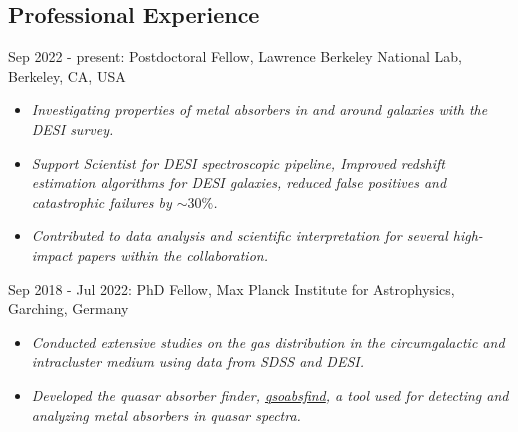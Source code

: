 \documentclass[12pt,letterpaper]{article}
\begin{document}
\subsection{Professional Experience}
\begin{list}{}{\cvlist}
\item Sep 2022 - present: Postdoctoral Fellow, Lawrence Berkeley National Lab, Berkeley, CA, USA \\
\begin{itemize}
 \item \emph{Investigating properties of metal absorbers in and around galaxies with the DESI survey.}
 \item \emph{Support Scientist for DESI spectroscopic pipeline, Improved redshift estimation algorithms for DESI galaxies, reduced false positives and catastrophic failures by $\sim 30\%$.}
  \item \emph{Contributed to data analysis and scientific interpretation for several high-impact papers within the collaboration.}
  \vspace{-1mm}
\end{itemize}
\item Sep 2018 - Jul 2022: PhD Fellow, Max Planck Institute for Astrophysics, Garching, Germany
\begin{itemize}
\item \emph{Conducted extensive studies on the gas distribution in the circumgalactic and intracluster medium using data from SDSS and DESI.}
  \vspace{-1mm}
\item \emph{Developed the quasar absorber finder, \href{https://github.com/abhi0395/qsoabsfind}{qsoabsfind}, a tool used for detecting and analyzing metal absorbers in quasar spectra.}
\end{itemize}
\end{list}
\vspace{-1.5mm}
\end{document}
